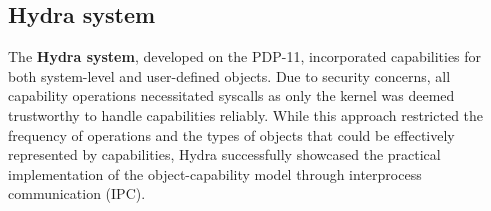 \subsection{Hydra system}
The \textbf{Hydra system}\cite{wulf_hydra_1974}, developed on the PDP-11, incorporated capabilities for both system-level 
and user-defined objects. Due to security concerns, all capability operations necessitated 
syscalls as only the kernel was deemed trustworthy to handle capabilities reliably. While 
this approach restricted the frequency of operations and the types of objects that 
could be effectively represented by capabilities, Hydra successfully showcased the 
practical implementation of the object-capability model through interprocess communication (IPC).
\newline

